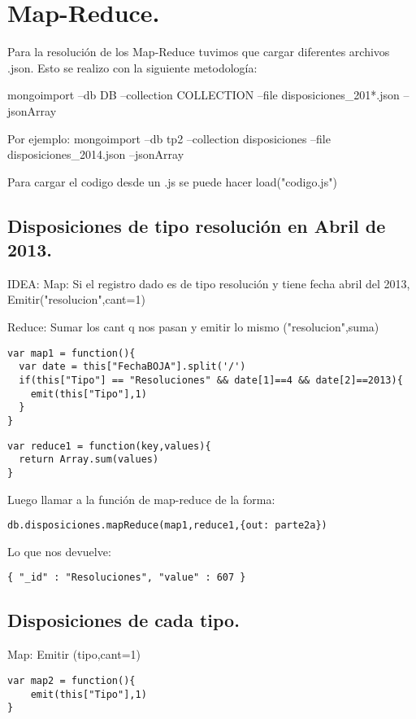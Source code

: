 \section{Map-Reduce.}
Para la resolución de los Map-Reduce tuvimos que cargar diferentes archivos .json. Esto se realizo con la siguiente metodología: 

mongoimport --db DB --collection COLLECTION --file disposiciones_201*.json --jsonArray

Por ejemplo:
mongoimport --db tp2 --collection disposiciones --file disposiciones_2014.json --jsonArray

Para cargar el codigo desde un .js se puede hacer load("codigo.js")

\subsection{Disposiciones de tipo resolución en Abril de 2013.}
IDEA:
Map:
Si el registro dado es de tipo resolución y tiene fecha abril del 2013, Emitir("resolucion",cant=1)

Reduce:
Sumar los cant q nos pasan y emitir lo mismo ("resolucion",suma)

\begin{lstlisting}
var map1 = function(){
  var date = this["FechaBOJA"].split('/')
  if(this["Tipo"] == "Resoluciones" && date[1]==4 && date[2]==2013){
    emit(this["Tipo"],1)
  }
}
\end{lstlisting}

\begin{lstlisting}
var reduce1 = function(key,values){
  return Array.sum(values)
}
\end{lstlisting}

Luego llamar a la función de map-reduce de la forma:
\begin{lstlisting}
db.disposiciones.mapReduce(map1,reduce1,{out: parte2a})
\end{lstlisting}

Lo que nos devuelve:

\begin{lstlisting}
{ "_id" : "Resoluciones", "value" : 607 }
\end{lstlisting}

\subsection{Disposiciones de cada tipo.}
Map:
Emitir (tipo,cant=1)
\begin{lstlisting}
var map2 = function(){
	emit(this["Tipo"],1)
}

\end{lstlisting}

